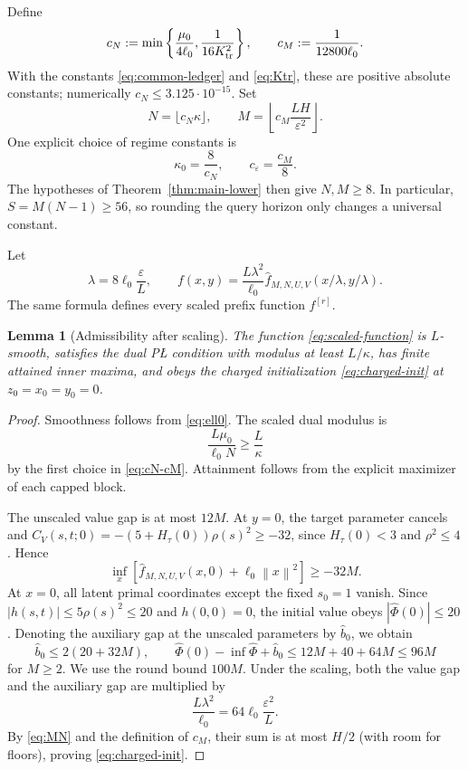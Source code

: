 \documentclass[11pt,a4paper]{article}
\newcommand{\eps}{\varepsilon}
\newcommand{\norm}[1]{\left\lVert #1\right\rVert}
\newtheorem{lemma}[theorem]{Lemma}
\theoremstyle{definition}
\theoremstyle{remark}
\numberwithin{equation}{section}
\begin{document}
Define
\begin{equation}
 c_N:=\min\left\{
  \frac{\mu_0}{4\ell_0},
  \frac{1}{16K_{\rm tr}^2}
 \right\},
 \qquad
 c_M:=\frac{1}{12800\ell_0}.
 \label{eq:cN-cM}
\end{equation}
With the constants \eqref{eq:common-ledger} and \eqref{eq:Ktr}, these are positive absolute constants; numerically $c_N\le3.125\cdot10^{-15}$.  Set
\begin{equation}
 N=\lfloor c_N\kappa\rfloor,
 \qquad
 M=\left\lfloor c_M\frac{LH}{\eps^2}\right\rfloor.
 \label{eq:MN}
\end{equation}
One explicit choice of regime constants is
\begin{equation}
 \kappa_0=\frac8{c_N},\qquad c_\eps=\frac{c_M}{8}.
 \label{eq:regime-constants}
\end{equation}
The hypotheses of Theorem~\ref{thm:main-lower} then give $N,M\ge8$.
In particular, $S=M(N-1)\ge56$, so rounding the query horizon only
changes a universal constant.

Let
\begin{equation}
 \lambda=8\ell_0\frac{\eps}{L},
 \qquad
 f(x,y)=\frac{L\lambda^2}{\ell_0}
 \widehat f_{M,N,U,V}(x/\lambda,y/\lambda).
 \label{eq:scaled-function}
\end{equation}
The same formula defines every scaled prefix function $f^{[r]}$.

\begin{lemma}[Admissibility after scaling]
\label{lem:scaled-admissible}
The function \eqref{eq:scaled-function} is $L$-smooth, satisfies the dual P\L{} condition with modulus at least $L/\kappa$, has finite attained inner maxima, and obeys the charged initialization \eqref{eq:charged-init} at $z_0=x_0=y_0=0$.
\end{lemma}

\begin{proof}
Smoothness follows from \eqref{eq:ell0}.  The scaled dual modulus is
\[
 \frac{L\mu_0}{\ell_0N}
 \ge\frac{L}{\kappa}
\]
by the first choice in \eqref{eq:cN-cM}.  Attainment follows from the explicit maximizer of each capped block.

The unscaled value gap is at most $12M$.  At $y=0$, the target parameter cancels and
$C_V(s,t;0)=-(5+H_\tau(0))\rho(s)^2\ge-32$,
since $H_\tau(0)<3$ and $\rho^2\le4$. Hence
\[
 \inf_x\left[
   \widehat f_{M,N,U,V}(x,0)+\ell_0\norm x^2
 \right]\ge-32M.
\]
At $x=0$, all latent primal coordinates except the fixed $s_0=1$ vanish.  Since
$|h(s,t)|\le5\rho(s)^2\le20$ and $h(0,0)=0$, the initial value obeys
$|\widehat\Phi(0)|\le20$.  Denoting the auxiliary gap at the unscaled parameters by $\widehat b_0$, we obtain
\[
 \widehat b_0
 \le2(20+32M),
 \qquad
 \widehat\Phi(0)-\inf\widehat\Phi+\widehat b_0
 \le12M+40+64M\le96M
\]
for $M\ge2$.  We use the round bound $100M$.  Under the scaling, both the value gap and the auxiliary gap are multiplied by
\[
 \frac{L\lambda^2}{\ell_0}
 =64\ell_0\frac{\eps^2}{L}.
\]
By \eqref{eq:MN} and the definition of $c_M$, their sum is at most $H/2$ (with room for floors), proving \eqref{eq:charged-init}.
\end{proof}
\end{document}
